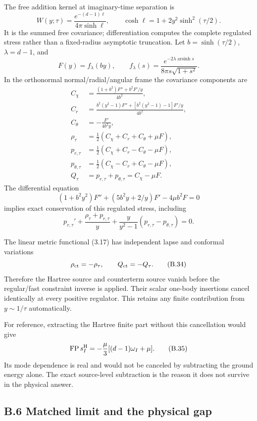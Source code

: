 The free addition kernel at imaginary-time separation is \[
W(y;\tau)=\frac{e^{-(d-1)\ell}}{4\pi\sinh\ell},\qquad
\cosh\ell=1+2y^2\sinh^2(\tau/2).
\tag{B.32}
\] It is the summed free covariance; differentiation computes the complete regulated stress rather than a fixed-radius asymptotic truncation. Let \(b=\sinh(\tau/2)\), \(\lambda=d-1\), and \[
F(y)=f_\lambda(by),\qquad
f_\lambda(s)=
\frac{e^{-2\lambda\operatorname{arsinh}s}}
{8\pi s\sqrt{1+s^2}}.
\] In the orthonormal normal/radial/angular frame the covariance components are \[
\begin{aligned}
C_\chi&=\frac{(1+b^2)F''+b^2F'/y}{4b^2},\\
C_r&=\frac{b^2(y^2-1)F''+[b^2(y^2-1)-1]F'/y}{4b^2},\\
C_\theta&=-\frac{F'}{4b^2y},\\
\rho_\tau&=\tfrac12(C_\chi+C_r+C_\theta+\mu F),\\
p_{r,\tau}&=\tfrac12(C_\chi+C_r-C_\theta-\mu F),\\
p_{\theta,\tau}&=\tfrac12(C_\chi-C_r+C_\theta-\mu F),\\
Q_\tau&=p_{r,\tau}+p_{\theta,\tau}=C_\chi-\mu F .
\end{aligned}
\tag{B.33}
\] The differential equation \[
(1+b^2y^2)F''+(5b^2y+2/y)F'-4\mu b^2F=0
\] implies exact conservation of this regulated stress, including \[
p_{r,\tau}'+\frac{\rho_\tau+p_{r,\tau}}y
+\frac{y}{y^2-1}(p_{r,\tau}-p_{\theta,\tau})=0.
\]

The linear metric functional (3.17) has independent lapse and conformal variations \[
\rho_{\rm ct}=-\rho_\tau,\qquad Q_{\rm ct}=-Q_\tau .
\tag{B.34}
\] Therefore the Hartree source and counterterm source vanish before the regular/fast constraint inverse is applied. Their scalar one-body insertions cancel identically at every positive regulator. This retains any finite contribution from \(y\sim1/\tau\) automatically.

For reference, extracting the Hartree finite part without this cancellation would give \[
\operatorname{FP}s_I^{\rm H}
=-\frac{\mu}{3}[(d-1)\omega_I+\mu] .
\tag{B.35}
\] Its mode dependence is real and would not be canceled by subtracting the ground energy alone. The exact source-level subtraction is the reason it does not survive in the physical answer.

\hypertarget{b.6-matched-limit-and-the-physical-gap}{%
\subsection{B.6 Matched limit and the physical gap}\label{b.6-matched-limit-and-the-physical-gap}}


